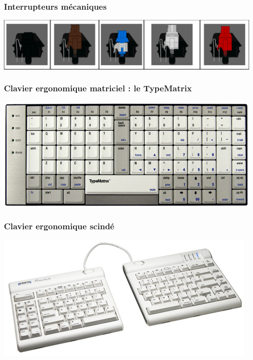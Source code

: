 \documentclass[c,12pt]{beamer}
\begin{document}
\begin{frame}
	\frametitle{Interrupteurs mécaniques}
	\begin{center}
		\includegraphics[scale=0.2]{meca.png}
	\end{center}
\end{frame}

\begin{frame}
	\frametitle{Clavier ergonomique matriciel : le TypeMatrix}
	\begin{center}
		\includegraphics[scale=0.32]{typematrix.jpg}
	\end{center}
\end{frame}

\begin{frame}
	\frametitle{Clavier ergonomique scindé}
	\begin{center}
		\includegraphics[scale=2.5]{scinde.jpg}
	\end{center}
\end{frame}
\end{document}
